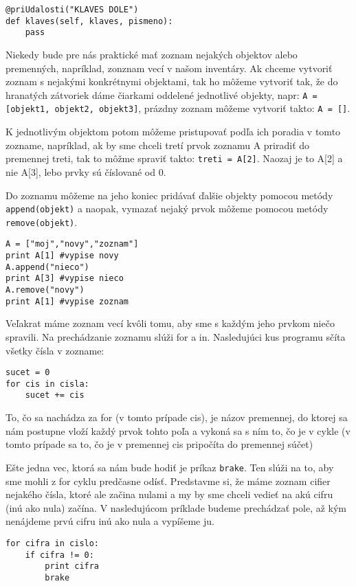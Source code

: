 \begin{lstlisting}
@priUdalosti("KLAVES DOLE")
def klaves(self, klaves, pismeno):
	pass
\end{lstlisting}


Niekedy bude pre nás praktické mať zoznam nejakých objektov alebo premenných, napríklad, zonznam vecí v našom inventáry. Ak chceme vytvoriť zoznam s nejakými konkrétnymi objektami, tak ho môžeme vytvoriť tak, že do hranatých zátvoriek dáme čiarkami oddelené jednotlivé objekty, napr: \texttt{A = [objekt1, objekt2, objekt3]}, prázdny zoznam môžeme vytvoriť takto: \texttt{A = []}.

K jednotlivým objektom potom môžeme pristupovať podľa ich poradia v tomto zozname, napríklad, ak by sme chceli tretí prvok zoznamu A priradiť do premennej treti, tak to môžme spraviť takto: \texttt{treti = A[2]}. Naozaj je to A[2] a nie A[3], lebo prvky sú číslované od 0.

Do zoznamu môžeme na jeho koniec pridávať ďalšie objekty pomocou metódy \texttt{append(objekt)} a naopak, vymazať nejaký prvok môžeme pomocou metódy \texttt{remove(objekt)}.

\begin{lstlisting}
A = ["moj","novy","zoznam"]
print A[1] #vypise novy
A.append("nieco")
print A[3] #vypise nieco
A.remove("novy")
print A[1] #vypise zoznam 
\end{lstlisting}

Veľakrat máme zoznam vecí kvôli tomu, aby sme s každým jeho prvkom niečo spravili. Na prechádzanie zoznamu slúži for a in. Nasledujúci kus programu sčíta všetky čísla v zozname:

\begin{lstlisting}
sucet = 0
for cis in cisla:
	sucet += cis
\end{lstlisting}

To, čo sa nachádza za for (v tomto prípade cis), je názov premennej, do ktorej sa nám postupne vloží každý prvok tohto poľa a vykoná sa s ním to, čo je v cykle (v tomto prípade sa to, čo je v premennej cis pripočíta do premennej súčet)

Ešte jedna vec, ktorá sa nám bude hodiť je príkaz \texttt{brake}. Ten slúži na to, aby sme mohli z for cyklu predčasne odísť. Predstavme si, že máme zoznam cifier nejakého čísla, ktoré ale začina nulami a my by sme chceli vedieť na akú cifru (inú ako nula) začína. V nasledujúcom príklade budeme prechádzať pole, až kým nenájdeme prvú cifru inú ako nula a vypíšeme ju.

\begin{lstlisting}
for cifra in cislo:
	if cifra != 0:
		print cifra
		brake
\end{lstlisting}



